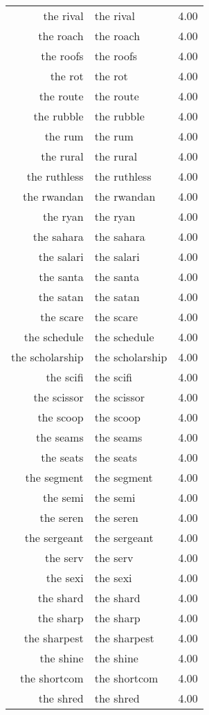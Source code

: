 \begin{table}[ht]
\begin{tabular}{rlr}
  the rival & the rival & 4.00 \\ 
  the roach & the roach & 4.00 \\ 
  the roofs & the roofs & 4.00 \\ 
  the rot & the rot & 4.00 \\ 
  the route & the route & 4.00 \\ 
  the rubble & the rubble & 4.00 \\ 
  the rum & the rum & 4.00 \\ 
  the rural & the rural & 4.00 \\ 
  the ruthless & the ruthless & 4.00 \\ 
  the rwandan & the rwandan & 4.00 \\ 
  the ryan & the ryan & 4.00 \\ 
  the sahara & the sahara & 4.00 \\ 
  the salari & the salari & 4.00 \\ 
  the santa & the santa & 4.00 \\ 
  the satan & the satan & 4.00 \\ 
  the scare & the scare & 4.00 \\ 
  the schedule & the schedule & 4.00 \\ 
  the scholarship & the scholarship & 4.00 \\ 
  the scifi & the scifi & 4.00 \\ 
  the scissor & the scissor & 4.00 \\ 
  the scoop & the scoop & 4.00 \\ 
  the seams & the seams & 4.00 \\ 
  the seats & the seats & 4.00 \\ 
  the segment & the segment & 4.00 \\ 
  the semi & the semi & 4.00 \\ 
  the seren & the seren & 4.00 \\ 
  the sergeant & the sergeant & 4.00 \\ 
  the serv & the serv & 4.00 \\ 
  the sexi & the sexi & 4.00 \\ 
  the shard & the shard & 4.00 \\ 
  the sharp & the sharp & 4.00 \\ 
  the sharpest & the sharpest & 4.00 \\ 
  the shine & the shine & 4.00 \\ 
  the shortcom & the shortcom & 4.00 \\ 
  the shred & the shred & 4.00 \\ 

\end{tabular}
\end{table}
